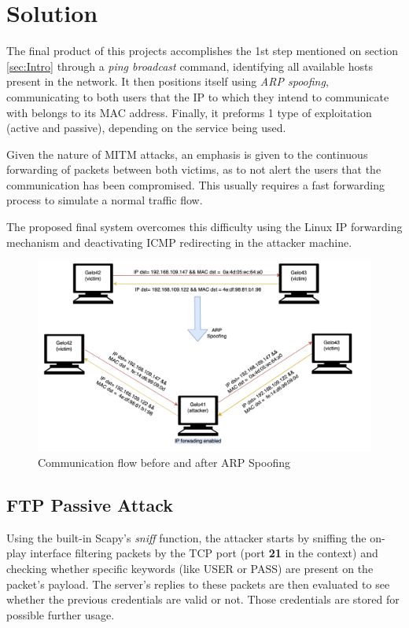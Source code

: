 \section{Solution}

The final product of this projects accomplishes the 1st step mentioned on 
section \ref{sec:Intro} through a \textit{ping broadcast} command, 
identifying all available hosts present in the network.
It then positions itself using \textit{ARP spoofing}, communicating to both 
users that the IP to which they intend to communicate with belongs to its MAC 
address. 
Finally, it preforms 1 type of exploitation (active and passive), depending on
the service being used.

Given the nature of MITM attacks, an emphasis is given to the continuous 
forwarding of packets between both victims, as to not alert the users that the 
communication has been compromised.
This usually requires a fast forwarding process to simulate a normal traffic 
flow. 

The proposed final system overcomes this difficulty using the Linux 
IP forwarding mechanism and deactivating ICMP redirecting in the attacker machine.

\begin{figure}[h!]
    \centering
    \includegraphics[width=1\linewidth,keepaspectratio]{ARPSpoffing.png}
    \caption{Communication flow before and after ARP Spoofing}
    \label{fig:ArpSpoofing}
\end{figure}
\FloatBarrier

\subsection{FTP Passive Attack}

Using the built-in Scapy's \textit{sniff} function, the attacker starts by sniffing the on-play interface filtering packets by the TCP port (port \textbf{21} in the context) and checking whether specific keywords (like USER or PASS) are present on the packet's payload. The server's replies to these packets are then evaluated to see whether the previous credentials are valid or not. Those credentials are stored for possible further usage. 


